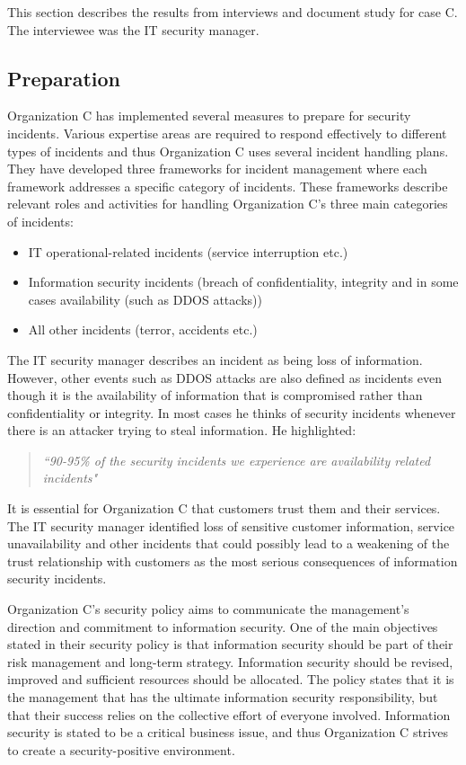 This section describes the results from interviews and document study for case C. The interviewee was the IT security manager. 

\subsection{Preparation}
Organization C has implemented several measures to prepare for security incidents. Various expertise areas are required to respond effectively to different types of incidents and thus Organization C uses several incident handling plans. They have developed three frameworks for incident management where each framework addresses a specific category of incidents. These frameworks describe relevant roles and activities for handling Organization C's three main categories of incidents:

\begin{itemize}
\item IT operational-related incidents (service interruption etc.)
\item Information security incidents (breach of confidentiality, integrity and in some cases availability (such as DDOS attacks))
\item All other incidents (terror, accidents etc.)
\end{itemize}
 
The IT security manager describes an incident as being loss of information. However, other events such as DDOS attacks are also defined as incidents even though it is the availability of information that is compromised rather than confidentiality or integrity. In most cases he thinks of security incidents whenever there is an attacker trying to steal information. He highlighted:

\begin{quote}
\textit{``90-95\% of the security incidents we experience are availability related incidents"}
\end{quote} 
 
It is essential for Organization C that customers trust them and their services. The IT security manager identified loss of sensitive customer information, service unavailability and other incidents that could possibly lead to a weakening of the trust relationship with customers as the most serious consequences of information security incidents. 

Organization C's security policy aims to communicate the management's direction and commitment to information security. One of the main objectives stated in their security policy is that information security should be part of their risk management and long-term strategy. Information security should be revised, improved and sufficient resources should be allocated. The policy states that it is the management that has the ultimate information security responsibility, but that their success relies on the collective effort of everyone involved. Information security is stated to be a critical business issue, and thus Organization C strives to create a security-positive environment.

